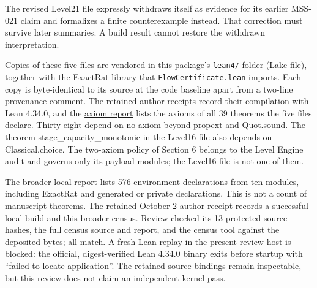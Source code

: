 \documentclass[
  11pt,
]{article}
\newcommand{\passthrough}[1]{#1}
\begin{document}
The revised Level21 file expressly withdraws itself as evidence for its
earlier MSS-021 claim and formalizes a finite counterexample instead.
That correction must survive later summaries. A build result cannot
restore the withdrawn interpretation.

Copies of these five files are vendored in this package's
\passthrough{\lstinline!lean4/!} folder
(\href{https://github.com/dbccpage/the_symbol_game/blob/main/education/documentation/030_pfp_proposal_fidelity_protocol_pfp/papers/symbol_game/008_pfp_mssn_tower_challenges_and_retraction_benchmarks/lean4/lakefile.lean}{Lake
file}), together with the ExactRat library that
\mbox{\nolinkurl{FlowCertificate.lean}} imports. Each copy is
byte-identical to its source at the code baseline apart from a two-line
provenance comment. The retained author receipts record their
compilation with Lean 4.34.0, and the
\href{https://github.com/dbccpage/the_symbol_game/blob/main/education/documentation/030_pfp_proposal_fidelity_protocol_pfp/papers/symbol_game/008_pfp_mssn_tower_challenges_and_retraction_benchmarks/lean4/axiom_report.txt}{axiom
report} lists the axioms of all 39 theorems the five files declare.
Thirty-eight depend on no axiom beyond propext and Quot.sound. The
theorem stage\_capacity\_monotonic in the Level16 file also depends on
Classical.choice. The two-axiom policy of Section 6 belongs to the Level
Engine audit and governs only its payload modules; the Level16 file is
not one of them.

The broader local
\href{https://github.com/dbccpage/the_symbol_game/blob/main/education/documentation/030_pfp_proposal_fidelity_protocol_pfp/papers/symbol_game/008_pfp_mssn_tower_challenges_and_retraction_benchmarks/lean4/full_axiom_report.txt}{report}
lists 576 environment declarations from ten modules, including ExactRat
and generated or private declarations. This is not a count of manuscript
theorems. The retained
\href{https://github.com/dbccpage/the_symbol_game/blob/main/education/documentation/030_pfp_proposal_fidelity_protocol_pfp/papers/symbol_game/008_pfp_mssn_tower_challenges_and_retraction_benchmarks/docs/release_validation_2026_10_02.json}{October
2 author receipt} records a successful local build and this broader
census. Review checked its 13 protected source hashes, the full census
source and report, and the census tool against the deposited bytes; all
match. A fresh Lean replay in the present review host is blocked: the
official, digest-verified Lean 4.34.0 binary exits before startup with
``failed to locate application''. The retained source bindings remain
inspectable, but this review does not claim an independent kernel pass.
\end{document}
